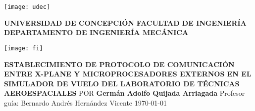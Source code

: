 \begin{titlepage}
\parbox{1.5cm}{
	\texttt{[image: udec]}
}
\hfill
\parbox[c][2cm]{0.7\textwidth}{
	\centering
	\textbf{UNIVERSIDAD DE CONCEPCIÓN}
	\vfill
	\textbf{FACULTAD DE INGENIERÍA}
	\vfill
	\textbf{DEPARTAMENTO DE INGENIERÍA MECÁNICA}
}
\hfill 
\parbox{1.5cm}{
	\texttt{[image: fi]}
}
\smallskip
\vspace*{6cm}
\centering
\textbf{ESTABLECIMIENTO DE PROTOCOLO DE COMUNICACIÓN ENTRE
X-PLANE Y MICROPROCESADORES EXTERNOS EN EL SIMULADOR DE VUELO DEL LABORATORIO DE TÉCNICAS AEROESPACIALES}
\bigbreak
POR
\bigbreak
\textbf{Germán Adolfo Quijada Arriagada}
\vfill
Profesor guía:
\smallbreak
Bernardo Andrés Hernández Vicente
\vfill
\today
\end{titlepage}